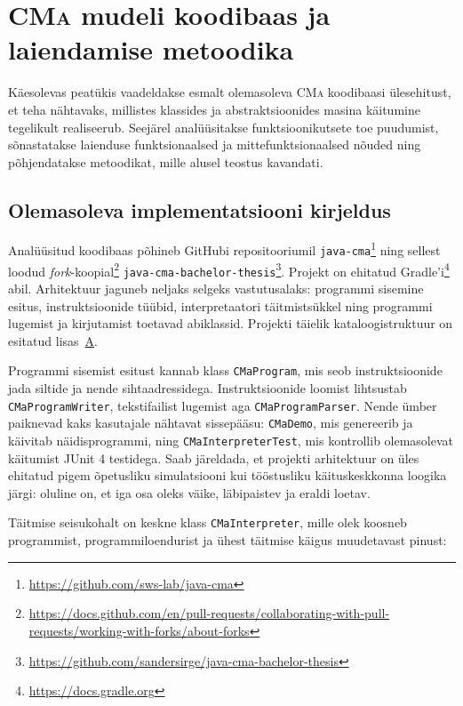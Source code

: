﻿\section{\textsc{CMa} mudeli koodibaas ja laiendamise metoodika}\label{implementatsioon}

Käesolevas peatükis vaadeldakse esmalt olemasoleva \textsc{CMa} koodibaasi ülesehitust, et teha nähtavaks, millistes klassides ja abstraktsioonides masina käitumine tegelikult realiseerub. Seejärel analüüsitakse funktsioonikutsete toe puudumist, sõnastatakse laienduse funktsionaalsed ja mittefunktsionaalsed nõuded ning põhjendatakse metoodikat, mille alusel teostus kavandati.

\subsection{Olemasoleva implementatsiooni kirjeldus}\label{implementatsioon:kirjeldus}

Analüüsitud koodibaas põhineb GitHubi repositooriumil \texttt{java-cma}\footnote{\url{https://github.com/sws-lab/java-cma}} ning sellest loodud \emph{fork}-koopial\footnote{\url{https://docs.github.com/en/pull-requests/collaborating-with-pull-requests/working-with-forks/about-forks}} \texttt{java-cma-bachelor-thesis}\footnote{\url{https://github.com/sandersirge/java-cma-bachelor-thesis}}. Projekt on ehitatud Gradle'i\footnote{\url{https://docs.gradle.org}} abil. Arhitektuur jaguneb neljaks selgeks vastutusalaks: programmi sisemine esitus, instruktsioonide tüübid, interpretaatori täitmistsükkel ning programmi lugemist ja kirjutamist toetavad abiklassid. Projekti täielik kataloogistruktuur on esitatud lisas~\hyperref[lisa:projektistruktuur]{A}.

Programmi sisemist esitust kannab klass \texttt{CMaProgram}, mis seob instruktsioonide jada siltide ja nende sihtaadressidega. Instruktsioonide loomist lihtsustab \texttt{CMaProgramWriter}, tekstifailist lugemist aga \texttt{CMaProgramParser}. Nende ümber paiknevad kaks kasutajale nähtavat sissepääsu: \texttt{CMaDemo}, mis genereerib ja käivitab näidisprogrammi, ning \texttt{CMaInterpreterTest}, mis kontrollib olemasolevat käitumist JUnit 4 testidega. Saab järeldada, et projekti arhitektuur on üles ehitatud pigem õpetusliku simulatsiooni kui tööstusliku käituskeskkonna loogika järgi: oluline on, et iga osa oleks väike, läbipaistev ja eraldi loetav.

Täitmise seisukohalt on keskne klass \texttt{CMaInterpreter}, mille olek koosneb programmist, programmiloendurist ja ühest täitmise käigus muudetavast pinust:

